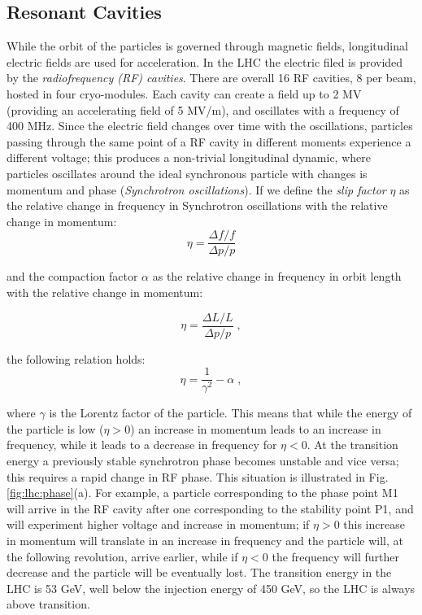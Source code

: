 \subsection{Resonant Cavities}

While the orbit of the particles is governed through magnetic fields, longitudinal electric fields are used for acceleration. In the LHC the electric filed is provided by the \textit{radiofrequency (RF) cavities}. There are overall 16 RF cavities, 8 per beam, hosted in four cryo-modules. Each cavity can create a field up to 2 MV (providing an accelerating field of 5 MV/m), and oscillates with a frequency of 400 MHz. Since the electric field changes over time with the oscillations, particles passing through the same point of a RF cavity in different moments experience a different voltage; this produces a non-trivial longitudinal dynamic, where particles oscillates around the ideal synchronous particle with changes is momentum and phase (\textit{Synchrotron oscillations}). If we define the \textit{slip factor} $\eta$ as the relative change in frequency in Synchrotron oscillations with the relative change in momentum:
\begin{equation}
\eta = \frac{\Delta f / f}{\Delta p / p}
\end{equation}

and the compaction factor $\alpha$ as the relative change in frequency in orbit length with the relative change in momentum:

\begin{equation}
\eta = \frac{\Delta L / L}{\Delta p / p} \; ,
\end{equation}

the following relation holds:
\begin{equation}
\eta = \frac{1}{\gamma^2} - \alpha \; ,
\end{equation}

where $\gamma$ is the Lorentz factor of the particle. This means that while the energy of the particle is low ($\eta>0$) an increase in momentum leads to an increase in frequency, while it leads to a decrease in frequency for $\eta<0$. At the transition energy a previously stable synchrotron phase becomes unstable and vice versa; this requires a rapid change in RF phase. This situation is illustrated in Fig. \ref{fig:lhc:phase}(a). For example, a particle corresponding to the phase point M1 will arrive in the RF cavity after one corresponding to the stability point P1, and will experiment higher voltage and increase in momentum; if $\eta>0$ this increase in momentum will translate in an increase in frequency and the particle will, at the following revolution, arrive earlier, while if $\eta<0$ the frequency will further decrease and the particle will be eventually lost.  The transition energy in the LHC is 53 GeV, well below the injection energy of 450 GeV, so the LHC is always above transition. 

